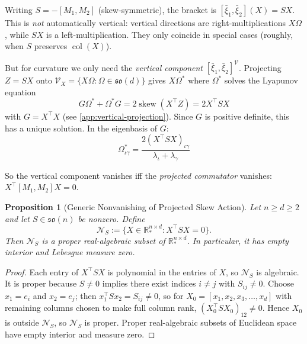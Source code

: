 \documentclass{article}
\newcommand{\RR}{\mathbb{R}}
\newcommand{\so}{\mathfrak{so}}
\DeclareMathOperator{\col}{col}
\DeclareMathOperator{\skewop}{skew}
\theoremstyle{plain}
\newtheorem{proposition}{Proposition}
\theoremstyle{definition}
\theoremstyle{remark}
\begin{document}
Writing $S = -[M_1, M_2]$ (skew-symmetric), the bracket is $[\bar{\xi}_1, \bar{\xi}_2](X) = SX$.
This is \emph{not} automatically vertical: vertical directions are right-multiplications $X\Omega$, while $SX$ is a left-multiplication. They only coincide in special cases (roughly, when $S$ preserves $\col(X)$).

But for curvature we only need the \emph{vertical component} $[\bar{\xi}_1, \bar{\xi}_2]^{\mathcal{V}}$.
Projecting $Z = SX$ onto $\mathcal{V}_X = \{X\Omega : \Omega \in \so(d)\}$ gives $X\Omega^*$ where $\Omega^*$ solves the Lyapunov equation
\begin{equation}
G \Omega^* + \Omega^* G = 2 \skewop(X^\top Z) = 2 X^\top S X
\end{equation}
with $G = X^\top X$ (see \cref{app:vertical-projection}).
Since $G$ is positive definite, this has a unique solution. In the eigenbasis of $G$:
\begin{equation}
\Omega^*_{\iota\gamma} = \frac{2(X^\top S X)_{\iota\gamma}}{\lambda_\iota + \lambda_\gamma}
\end{equation}

So the vertical component vanishes iff the \emph{projected commutator} vanishes:
$X^\top [M_1, M_2] X = 0$.

\begin{proposition}[Generic Nonvanishing of Projected Skew Action]\label{prop:generic-projected-skew}
Let $n \ge d \ge 2$ and let $S \in \so(n)$ be nonzero.
Define
\begin{equation}
\mathcal{N}_S := \{X \in \RR_*^{n \times d} : X^\top S X = 0\}.
\end{equation}
Then $\mathcal{N}_S$ is a proper real-algebraic subset of $\RR_*^{n \times d}$.
In particular, it has empty interior and Lebesgue measure zero.
\end{proposition}

\begin{proof}
Each entry of $X^\top S X$ is polynomial in the entries of $X$, so $\mathcal{N}_S$ is algebraic.
It is proper because $S \neq 0$ implies there exist indices $i \neq j$ with $S_{ij} \neq 0$.
Choose $x_1 = e_i$ and $x_2 = e_j$; then $x_1^\top S x_2 = S_{ij} \neq 0$, so for $X_0 = [x_1, x_2, x_3, \ldots, x_d]$ with remaining columns chosen to make full column rank, $(X_0^\top S X_0)_{12} \neq 0$.
Hence $X_0$ is outside $\mathcal{N}_S$, so $\mathcal{N}_S$ is proper.
Proper real-algebraic subsets of Euclidean space have empty interior and measure zero.
\end{proof}
\end{document}
